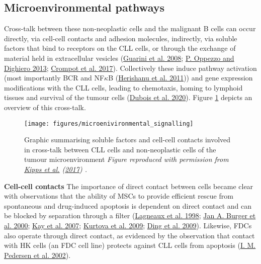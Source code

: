 \documentclass[11pt, a4paper, twosided]{book}
\begin{document}
\hypertarget{intro-microenvironmental-pathways}{%
\subsection{Microenvironmental pathways}\label{intro-microenvironmental-pathways}}

Cross-talk between these non-neoplastic cells and the malignant B cells can occur directly, via cell-cell contacts and adhesion molecules, indirectly, via soluble factors that bind to receptors on the CLL cells, or through the exchange of material held in extracellular vesicles (\protect\hyperlink{ref-Guarini2008}{Guarini et al. 2008}; \protect\hyperlink{ref-Oppezzo2013}{P. Oppezzo and Dighiero 2013}; \protect\hyperlink{ref-Crompot2017}{Crompot et al. 2017}). Collectively these induce pathway activation (most importantly BCR and NF\(\kappa\)B (\protect\hyperlink{ref-Herishanu2011}{Herishanu et al. 2011})) and gene expression modifications with the CLL cells, leading to chemotaxis, homing to lymphoid tissues and survival of the tumour cells (\protect\hyperlink{ref-Dubois2020}{Dubois et al. 2020}). Figure \ref{fig:microenvironmentSignalling} depicts an overview of this cross-talk.


\begin{figure}

{\centering \texttt{[image: figures/microenivironmental\_signalling]} 

}

\caption{Graphic summarising soluble factors and cell-cell contacts involved in cross-talk between CLL cells and non-neoplastic cells of the tumour microenvironment \emph{Figure reproduced with permission from \protect\hyperlink{ref-Kipps2017}{Kipps et al.} (\protect\hyperlink{ref-Kipps2017}{2017}) .}}\label{fig:microenvironmentSignalling}
\end{figure}
\textbf{Cell-cell contacts}
The importance of direct contact between cells became clear with observations that the ability of MSCs to provide efficient rescue from spontaneous and drug-induced apoptosis is dependent on direct contact and can be blocked by separation through a filter (\protect\hyperlink{ref-Lagneaux1998}{Lagneaux et al. 1998}; \protect\hyperlink{ref-Burger2000}{Jan A. Burger et al. 2000}; \protect\hyperlink{ref-Kay2007}{Kay et al. 2007}; \protect\hyperlink{ref-Kurtova2009}{Kurtova et al. 2009}; \protect\hyperlink{ref-Ding2009}{Ding et al. 2009}). Likewise, FDCs also operate through direct contact, as evidenced by the observation that contact with HK cells (an FDC cell line) protects against CLL cells from apoptosis (\protect\hyperlink{ref-Pedersen2002}{I. M. Pedersen et al. 2002}).
\end{document}
